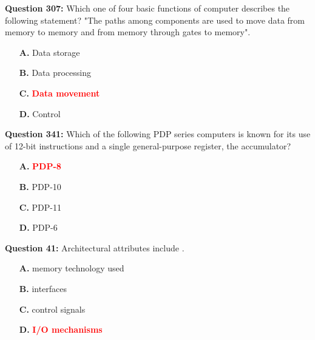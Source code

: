 \documentclass[12pt,a4paper]{article}
\begin{document}
\vspace{0.5cm}

\textbf{Question 307:} Which one of four basic functions of computer describes the following statement? "The paths among components are used to move data from memory to memory and from memory through gates to memory".

\begin{itemize}
    \item[\textbf{A.}] Data storage
    \item[\textbf{B.}] Data processing
    \item[\textbf{C.}] \textcolor{red}{\textbf{Data movement}}
    \item[\textbf{D.}] Control
\end{itemize}

\vspace{0.5cm}

\vspace{0.5cm}

\textbf{Question 341:} Which of the following PDP series computers is known for its use of 12-bit instructions and a single general-purpose register, the accumulator?

\begin{itemize}
    \item[\textbf{A.}] \textcolor{red}{\textbf{PDP-8}}
    \item[\textbf{B.}] PDP-10
    \item[\textbf{C.}] PDP-11
    \item[\textbf{D.}] PDP-6
\end{itemize}

\vspace{0.5cm}

\vspace{0.5cm}

\textbf{Question 41:} Architectural attributes include \underline{\hspace{1.5cm}}.

\begin{itemize}
    \item[\textbf{A.}] memory technology used
    \item[\textbf{B.}] interfaces
    \item[\textbf{C.}] control signals
    \item[\textbf{D.}] \textcolor{red}{\textbf{I/O mechanisms}}
\end{itemize}

\vspace{0.5cm}
\end{document}

